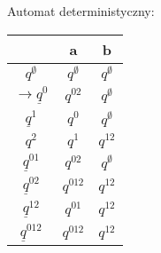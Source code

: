 \documentclass{article}
\begin{document}
Automat deterministyczny:
\vspace{-2cm}
\begin{tabular}{ c | c | c }
  & a & b \\ 
\hline
$q^\emptyset$         & $q^\emptyset$   & $q^\emptyset$ \\  \hline
$\rightarrow \underline q^0$     & $q^{02}$      & $q^\emptyset$ \\  \hline
$\underline q^1$                 & $q^0$         & $q^\emptyset$ \\ \hline
$q^2$      & $q^1$         & $q^{12}$ \\ \hline

$\underline q^{01}$              & $q^{02}$      & $q^\emptyset$ \\ \hline
$\underline q^{02}$   & $q^{012}$      & $q^{12}$ \\ \hline
$\underline q^{12}$   & $q^{01}$         & $q^{12}$ \\ \hline

$\underline q^{012}$  & $q^{012}$      & $q^{12}$ \\ 

\end{tabular}
\end{document}
